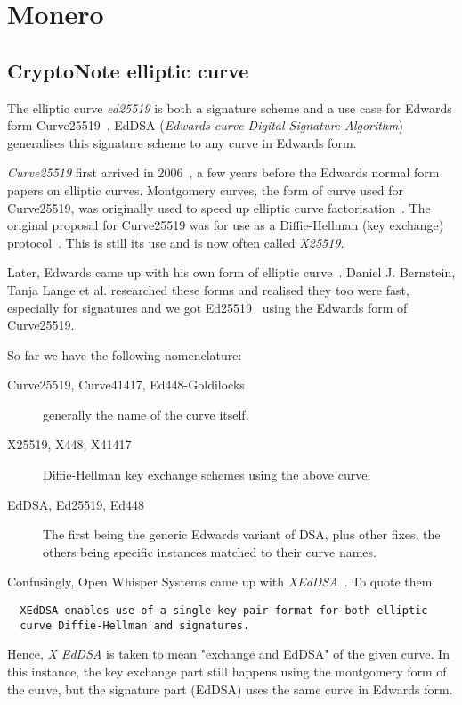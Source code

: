 \chapter{Monero}
%
\section{CryptoNote elliptic curve} \label{sec:ed25519}
The elliptic curve \emph{ed25519} is both a signature scheme and a use case for Edwards form Curve25519~\cite{eddsa}. EdDSA (\emph{Edwards-curve Digital Signature Algorithm}) generalises this signature scheme to any curve in Edwards form.

\emph{Curve25519} first arrived in 2006~\cite{curve25519}, a few years before the Edwards normal form papers on elliptic curves. Montgomery curves, the form of curve used for Curve25519, was originally used to speed up elliptic curve factorisation~\cite{montgomery}. The original proposal for Curve25519 was for use as a Diffie-Hellman (key exchange) protocol~\cite{Diffie:2006:NDC:2263321.2269104}. This is still its use and is now often called \emph{X25519}.

Later, Edwards came up with his own form of elliptic curve~\cite{edward}. Daniel J. Bernstein, Tanja Lange et al. researched these forms and realised they too were fast, especially for signatures and we got Ed25519~\cite{eddsa} using the Edwards form of Curve25519.

So far we have the following nomenclature:
\begin{description}
  \item [Curve25519, Curve41417, Ed448-Goldilocks] generally the name of the curve itself.
  \item [X25519, X448, X41417] Diffie-Hellman key exchange schemes using the above curve.
  \item [EdDSA, Ed25519, Ed448] The first being the generic Edwards variant of DSA, plus other fixes, the others being specific instances matched to their curve names.
\end{description}

Confusingly, Open Whisper Systems came up with \emph{XEdDSA}~\cite{signal}. To quote them:
\begin{verbatim}
  XEdDSA enables use of a single key pair format for both elliptic
  curve Diffie-Hellman and signatures.
\end{verbatim}

Hence, \emph{X EdDSA} is taken to mean "exchange and EdDSA" of the given curve. In this instance, the key exchange part still happens using the montgomery form of the curve, but the signature part (EdDSA) uses the same curve in Edwards form.

